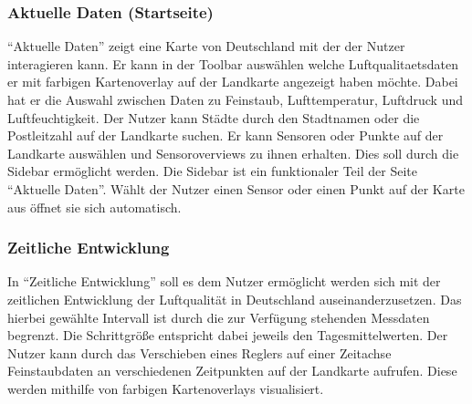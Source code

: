 \subsubsection{Aktuelle Daten (Startseite)}

\enquote{Aktuelle Daten} zeigt eine Karte von Deutschland mit der der Nutzer interagieren kann. 
Er kann in der \gls{Toolbar} auswählen welche \gls{Luftqualitaetsdaten} er mit farbigen \gls{Kartenoverlay} auf der Landkarte angezeigt haben möchte. 
Dabei hat er die Auswahl zwischen Daten zu \gls{Feinstaub}, Lufttemperatur, Luftdruck und Luftfeuchtigkeit.
Der Nutzer kann Städte durch den Stadtnamen oder die Postleitzahl auf der Landkarte suchen. Er kann Sensoren oder Punkte auf der Landkarte auswählen und \glspl{Sensoroverview} zu ihnen erhalten. Dies soll durch die \gls{Sidebar} ermöglicht werden.
Die \gls{Sidebar} ist ein funktionaler Teil der Seite \enquote{Aktuelle Daten}. Wählt der Nutzer einen \gls{Sensor} oder einen Punkt auf der Karte aus öffnet sie sich automatisch.



\subsubsection{Zeitliche Entwicklung}

In \enquote{Zeitliche Entwicklung} soll es dem Nutzer ermöglicht werden sich mit der zeitlichen Entwicklung der Luftqualität in Deutschland auseinanderzusetzen. Das hierbei gewählte Intervall ist durch die zur Verfügung stehenden Messdaten begrenzt. Die Schrittgröße entspricht dabei jeweils den Tagesmittelwerten.
Der Nutzer kann durch das Verschieben eines Reglers auf einer Zeitachse \gls{Feinstaub}daten an verschiedenen Zeitpunkten auf der Landkarte aufrufen. Diese werden mithilfe von farbigen \glspl{Kartenoverlay} visualisiert.
\\
\\

